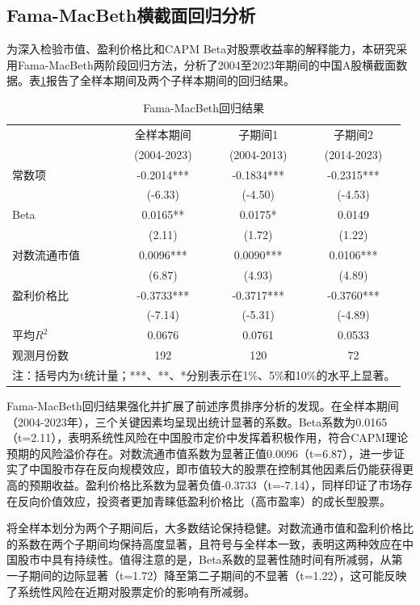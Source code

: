 \documentclass[12pt, a4paper]{article}
\begin{document}
\subsection{Fama-MacBeth横截面回归分析}

为深入检验市值、盈利价格比和CAPM Beta对股票收益率的解释能力，本研究采用Fama-MacBeth两阶段回归方法，分析了2004至2023年期间的中国A股横截面数据。表\ref{tab:fama_macbeth}报告了全样本期间及两个子样本期间的回归结果。

\begin{table}[htbp]
\centering
\caption{Fama-MacBeth回归结果}
\label{tab:fama_macbeth}
\begin{tabular}{lccc}
\toprule
 & 全样本期间 & 子期间1 & 子期间2 \\
 & (2004-2023) & (2004-2013) & (2014-2023) \\
\midrule
常数项 & -0.2014*** & -0.1834*** & -0.2315*** \\
 & (-6.33) & (-4.50) & (-4.53) \\
Beta & 0.0165** & 0.0175* & 0.0149 \\
 & (2.11) & (1.72) & (1.22) \\
对数流通市值 & 0.0096*** & 0.0090*** & 0.0106*** \\
 & (6.87) & (4.93) & (4.89) \\
盈利价格比 & -0.3733*** & -0.3717*** & -0.3760*** \\
 & (-7.14) & (-5.31) & (-4.89) \\
\midrule
平均$R^2$ & 0.0676 & 0.0761 & 0.0533 \\
观测月份数 & 192 & 120 & 72 \\
\bottomrule
\multicolumn{4}{l}{\scriptsize 注：括号内为t统计量；***、**、*分别表示在1\%、5\%和10\%的水平上显著。}
\end{tabular}
\end{table}

Fama-MacBeth回归结果强化并扩展了前述序贯排序分析的发现。在全样本期间（2004-2023年），三个关键因素均呈现出统计显著的系数。Beta系数为0.0165（t=2.11），表明系统性风险在中国股市定价中发挥着积极作用，符合CAPM理论预期的风险溢价存在。对数流通市值系数为显著正值0.0096（t=6.87），进一步证实了中国股市存在反向规模效应，即市值较大的股票在控制其他因素后仍能获得更高的预期收益。盈利价格比系数为显著负值-0.3733（t=-7.14），同样印证了市场存在反向价值效应，投资者更加青睐低盈利价格比（高市盈率）的成长型股票。

将全样本划分为两个子期间后，大多数结论保持稳健。对数流通市值和盈利价格比的系数在两个子期间均保持高度显著，且符号与全样本一致，表明这两种效应在中国股市中具有持续性。值得注意的是，Beta系数的显著性随时间有所减弱，从第一子期间的边际显著（t=1.72）降至第二子期间的不显著（t=1.22），这可能反映了系统性风险在近期对股票定价的影响有所减弱。
\end{document}
